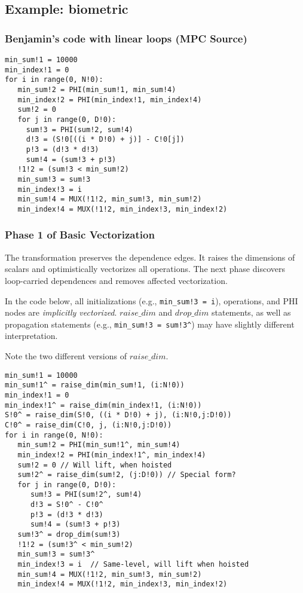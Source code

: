 
%

\subsection{Example: biometric}

\subsubsection{Benjamin's code with linear loops (MPC Source)}

\begin{verbatim}
min_sum!1 = 10000
min_index!1 = 0
for i in range(0, N!0):
   min_sum!2 = PHI(min_sum!1, min_sum!4)
   min_index!2 = PHI(min_index!1, min_index!4)
   sum!2 = 0
   for j in range(0, D!0):
     sum!3 = PHI(sum!2, sum!4)
     d!3 = (S!0[((i * D!0) + j)] - C!0[j])
     p!3 = (d!3 * d!3)
     sum!4 = (sum!3 + p!3)
   !1!2 = (sum!3 < min_sum!2)
   min_sum!3 = sum!3
   min_index!3 = i
   min_sum!4 = MUX(!1!2, min_sum!3, min_sum!2)
   min_index!4 = MUX(!1!2, min_index!3, min_index!2)
\end{verbatim}

\subsubsection{Phase 1 of Basic Vectorization}

The transformation preserves the dependence edges. It raises the dimensions of scalars and optimistically vectorizes all operations. 
The next phase discovers loop-carried dependences and removes affected vectorization.

In the code below, all initializations (e.g., \texttt{min\_sum!3 = i}), operations, and PHI nodes are \emph{implicitly vectorized}. 
$\mathit{raise\_dim}$ and $\mathit{drop\_dim}$ statements, as well as propagation statements (e.g., \texttt{min\_sum!3 = sum!3\^}) 
may have slightly different interpretation. 

Note the two different versions of $\mathit{raise\_dim}$. 

\begin{verbatim}
min_sum!1 = 10000
min_sum!1^ = raise_dim(min_sum!1, (i:N!0))
min_index!1 = 0
min_index!1^ = raise_dim(min_index!1, (i:N!0))
S!0^ = raise_dim(S!0, ((i * D!0) + j), (i:N!0,j:D!0))
C!0^ = raise_dim(C!0, j, (i:N!0,j:D!0))
for i in range(0, N!0):
   min_sum!2 = PHI(min_sum!1^, min_sum!4)
   min_index!2 = PHI(min_index!1^, min_index!4) 
   sum!2 = 0 // Will lift, when hoisted
   sum!2^ = raise_dim(sum!2, (j:D!0)) // Special form?
   for j in range(0, D!0):
      sum!3 = PHI(sum!2^, sum!4)
      d!3 = S!0^ - C!0^
      p!3 = (d!3 * d!3) 
      sum!4 = (sum!3 + p!3)
   sum!3^ = drop_dim(sum!3)     
   !1!2 = (sum!3^ < min_sum!2)
   min_sum!3 = sum!3^
   min_index!3 = i  // Same-level, will lift when hoisted
   min_sum!4 = MUX(!1!2, min_sum!3, min_sum!2)
   min_index!4 = MUX(!1!2, min_index!3, min_index!2)
\end{verbatim}

